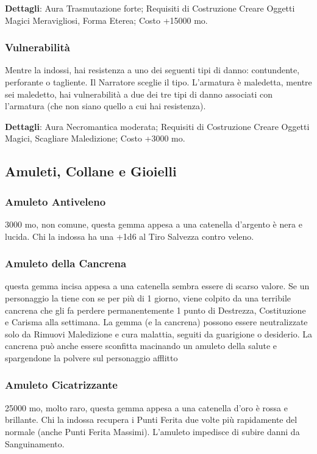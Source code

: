 \begin{multicols}{2}
	\textbf{Dettagli}: Aura Trasmutazione forte; Requisiti di Costruzione Creare Oggetti Magici Meravigliosi, Forma Eterea; Costo +15000 mo.

	\subsubsection*{Vulnerabilità}

	Mentre la indossi, hai resistenza a uno dei seguenti tipi di danno: contundente, perforante o tagliente. Il Narratore sceglie il tipo. L'armatura è maledetta, mentre sei maledetto, hai vulnerabilità a due dei tre tipi di danno associati con l'armatura (che non siano quello a cui hai resistenza).

	\textbf{Dettagli}: Aura Necromantica moderata; Requisiti di Costruzione Creare Oggetti Magici, Scagliare Maledizione; Costo +3000 mo.


	\subsection{Amuleti, Collane e Gioielli}

	\subsubsection*{Amuleto Antiveleno}
	3000 mo, non comune, questa gemma appesa a una catenella d’argento è nera e lucida. Chi la indossa ha una +1d6 al Tiro Salvezza contro veleno.

	\subsubsection*{Amuleto della Cancrena}
	questa gemma incisa appesa a una catenella sembra essere di scarso valore. Se un personaggio la tiene con se per più di 1 giorno, viene colpito da una terribile cancrena che gli fa perdere permanentemente 1 punto di Destrezza, Costituzione e Carisma alla settimana. La gemma (e la cancrena) possono essere neutralizzate solo da Rimuovi Maledizione e cura malattia, seguiti da guarigione o desiderio. La cancrena può anche essere sconfitta macinando un amuleto della salute e spargendone la polvere sul personaggio afflitto

	\subsubsection*{Amuleto Cicatrizzante}
	25000 mo, molto raro, questa gemma appesa a una catenella d’oro è rossa e brillante. Chi la indossa recupera i Punti Ferita due volte più rapidamente del normale (anche Punti Ferita Massimi). L’amuleto impedisce di subire danni da Sanguinamento.


\end{multicols}

